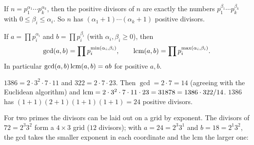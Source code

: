 \begin{proposition}
If $n = p_1^{\alpha_1}\cdots p_k^{\alpha_k}$, then the positive divisors of $n$ are exactly the
numbers $p_1^{\beta_1}\cdots p_k^{\beta_k}$ with $0 \le \beta_i \le \alpha_i$. So $n$ has
$(\alpha_1 + 1)\cdots(\alpha_k + 1)$ positive divisors.
\end{proposition}

\begin{theorem}
If $a = \prod p_i^{\alpha_i}$ and $b = \prod p_i^{\beta_i}$ (with $\alpha_i,\beta_i \ge 0$),
then
\[ \gcd(a,b) = \prod p_i^{\min(\alpha_i,\beta_i)}, \qquad
   \operatorname{lcm}(a,b) = \prod p_i^{\max(\alpha_i,\beta_i)}. \]
In particular $\gcd(a,b)\operatorname{lcm}(a,b) = ab$ for positive $a,b$.
\end{theorem}

\begin{example}
$1386 = 2\cdot 3^2 \cdot 7 \cdot 11$ and $322 = 2 \cdot 7 \cdot 23$. Then
$\gcd = 2\cdot 7 = 14$ (agreeing with the Euclidean algorithm) and
$\operatorname{lcm} = 2\cdot 3^2\cdot 7\cdot 11\cdot 23 = 31878 = 1386\cdot 322/14$.
$1386$ has $(1+1)(2+1)(1+1)(1+1) = 24$ positive divisors.
\end{example}

For two primes the divisors can be laid out on a grid by exponent. The divisors of
$72 = 2^3 3^2$ form a $4 \times 3$ grid ($12$ divisors); with $a = 24 = 2^3 3^1$ and
$b = 18 = 2^1 3^2$, the gcd takes the smaller exponent in each coordinate and the lcm the
larger one:
\begin{center}
\end{center}

